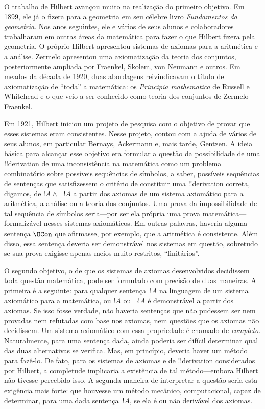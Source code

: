 \documentclass[../../../include/open-logic-section]{subfiles}
\begin{document}
O trabalho de Hilbert avançou muito na realização do primeiro objetivo.
Em 1899, ele já o fizera para a geometria em seu célebre livro
\emph{Fundamentos da geometria}. Nos anos seguintes, ele e vários de
seus alunos e colaboradores trabalharam em outras áreas da matemática
para fazer o que Hilbert fizera pela geometria. O próprio Hilbert
apresentou sistemas de axiomas para a aritmética e a análise. Zermelo
apresentou uma axiomatização da teoria dos conjuntos, posteriormente
ampliada por Fraenkel, Skolem, von Neumann e outros. Em meados da década
de 1920, duas abordagens reivindicavam o título de axiomatização de
``toda'' a matemática: os \emph{Principia mathematica} de Russell e
Whitehead e o que veio a ser conhecido como teoria dos conjuntos de
Zermelo--Fraenkel.

Em 1921, Hilbert iniciou um projeto de pesquisa com o objetivo de provar
que esses sistemas eram consistentes. Nesse projeto, contou com a ajuda
de vários de seus alunos, em particular Bernays, Ackermann e, mais
tarde, Gentzen. A ideia básica para alcançar esse objetivo era
formular a questão da possibilidade de uma !!{derivation} de uma
inconsistência na matemática como um problema combinatório sobre
possíveis sequências de símbolos, a saber, possíveis sequências de
sentenças que satisfizessem o critério de constituir uma
!!{derivation} correta, digamos, de $!A \land \lnot !A$ a partir dos
axiomas de um sistema axiomático para a aritmética, a análise ou a
teoria dos conjuntos. Uma prova da impossibilidade de tal sequência de
símbolos seria---por ser ela própria uma prova matemática---formalizável
nesses sistemas axiomáticos. Em outras palavras, haveria alguma
sentença $\OCon$ que afirmasse, por exemplo, que a aritmética é
consistente. Além disso, essa sentença deveria ser demonstrável nos
sistemas em questão, sobretudo se sua prova exigisse apenas meios muito
restritos, ``finitários''.

O segundo objetivo, o de que os sistemas de axiomas desenvolvidos
decidissem toda questão matemática, pode ser formulado com precisão de
duas maneiras. A primeira é a seguinte: para qualquer sentença~$!A$ na
linguagem de um sistema axiomático para a matemática, ou $!A$ ou
$\lnot !A$ é demonstrável a partir dos axiomas. Se isso fosse verdade,
não haveria sentenças que não pudessem ser nem provadas nem refutadas
com base nos axiomas, nem questões que os axiomas não decidissem. Um
sistema axiomático com essa propriedade é chamado de \emph{completo}.
Naturalmente, para uma sentença dada, ainda poderia ser difícil
determinar qual das duas alternativas se verifica. Mas, em princípio,
deveria haver um método para fazê-lo. De fato, para os sistemas de
axiomas e de !!{derivation} considerados por Hilbert, a completude
implicaria a existência de tal método---embora Hilbert não tivesse
percebido isso. A segunda maneira de interpretar a questão seria esta
exigência mais forte: que houvesse um método mecânico, computacional,
capaz de determinar, para uma dada sentença~$!A$, se ela é ou não
derivável dos axiomas.
\end{document}
